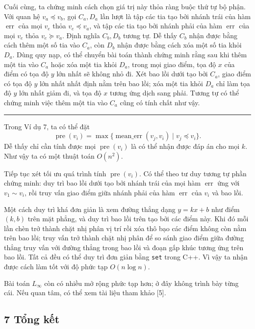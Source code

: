\documentclass[11pt]{article}
\newcommand{\qedmark}{\hfill\rule{0.7ex}{0.7ex}}
\begin{document}
Cuối cùng, ta chứng minh cách chọn giá trị này thỏa ràng buộc thứ tự bộ phận.
Với quan hệ \(v_a\preceq v_b\), gọi \(C_a,D_a\) lần lượt là tập các tia tạo bởi
nhánh trái của hàm \(\operatorname{err}\) của mọi \(v_e\) thỏa
\(v_e\preceq v_a\), và tập các tia tạo bởi nhánh phải của hàm
\(\operatorname{err}\) của mọi \(v_e\) thỏa \(v_e\succeq v_a\). Định nghĩa
\(C_b,D_b\) tương tự. Dễ thấy \(C_b\) nhận được bằng cách thêm một số tia vào
\(C_a\), còn \(D_b\) nhận được bằng cách xóa một số tia khỏi \(D_a\). Dùng quy
nạp, có thể chuyển bài toán thành chứng minh rằng sau khi thêm một tia vào
\(C_a\) hoặc xóa một tia khỏi \(D_a\), trong mọi giao điểm, tọa độ \(x\) của
điểm có tọa độ \(y\) lớn nhất sẽ không nhỏ đi. Xét bao lồi dưới tạo bởi \(C_a\),
giao điểm có tọa độ \(y\) lớn nhất nhất định nằm trên bao lồi; xóa một tia khỏi
\(D_a\) chỉ làm tọa độ \(y\) lớn nhất giảm đi, và tọa độ \(x\) tương ứng dịch
sang phải. Tương tự có thể chứng minh việc thêm một tia vào \(C_a\) cũng có
tính chất như vậy. \qedmark

Trong Ví dụ 7, ta có thể đặt
\[
  \operatorname{pre}(v_i)=
  \max\{\operatorname{mean\_err}(v_j,v_i)\mid v_j\preceq v_i\}.
\]
Dễ thấy chỉ cần tính được mọi \(\operatorname{pre}(v_i)\) là có thể nhận được
đáp án cho mọi \(k\). Như vậy ta có một thuật toán \(O(n^2)\).

Tiếp tục xét tối ưu quá trình tính \(\operatorname{pre}(v_i)\). Có thể theo tư
duy tương tự phần chứng minh: duy trì bao lồi dưới tạo bởi nhánh trái của mọi
hàm \(\operatorname{err}\) ứng với \(v_1\sim v_i\), rồi truy vấn giao điểm giữa
nhánh phải của hàm \(\operatorname{err}\) của \(v_i\) và bao lồi.

Một cách duy trì khá đơn giản là xem đường thẳng dạng \(y=kx+b\) như điểm
\((k,b)\) trên mặt phẳng, và duy trì bao lồi trên tạo bởi các điểm này. Khi đó
mỗi lần chèn trở thành chặt nhị phân vị trí rồi xóa thô bạo các điểm không còn
nằm trên bao lồi; truy vấn trở thành chặt nhị phân để so sánh giao điểm giữa
đường thẳng truy vấn với đường thẳng trong bao lồi và đoạn gấp khúc tương ứng
trên bao lồi. Tất cả đều có thể duy trì đơn giản bằng \texttt{set} trong C++.
Vì vậy ta nhận được cách làm tốt với độ phức tạp \(O(n\log n)\).

Bài toán \(L_\infty\) còn có nhiều mở rộng phức tạp hơn; ở đây không trình bày
từng cái. Nếu quan tâm, có thể xem tài liệu tham khảo [5].

\subsection*{7 Tổng kết}
\end{document}
